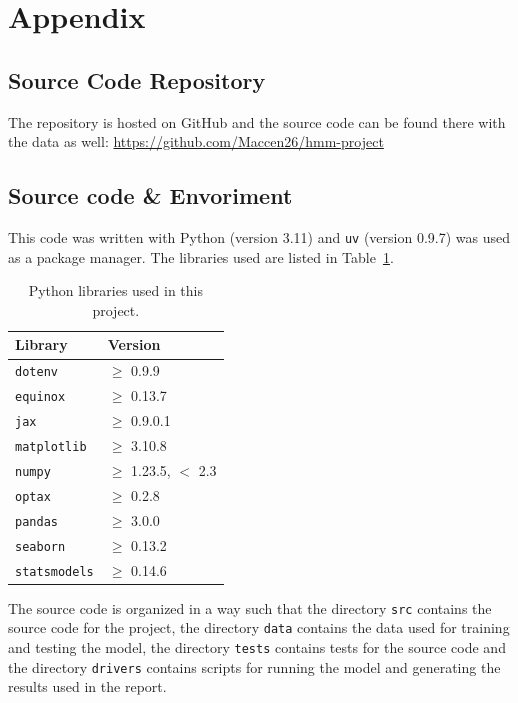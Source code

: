 \section{Appendix}

\subsection{Source Code Repository} \label{section:app:repo}
The repository is hosted on GitHub and the source code can be found there with the data as well:
\url{https://github.com/Maccen26/hmm-project}

\subsection{Source code \& Envoriment} \label{section:app:env}
This code was written with Python (version 3.11) and \texttt{uv} (version 0.9.7) \cite{astral_uv_docs} was used as a package manager.
The libraries used are listed in Table~\ref{tab:libraries}.

\begin{table}[H]
    \centering
    \begin{tabular}{ll}
        \toprule
        \textbf{Library} & \textbf{Version} \\
        \midrule
        \texttt{dotenv}      & $\geq$ 0.9.9 \\
        \texttt{equinox}     & $\geq$ 0.13.7 \\
        \texttt{jax}         & $\geq$ 0.9.0.1 \\
        \texttt{matplotlib}  & $\geq$ 3.10.8 \\
        \texttt{numpy}       & $\geq$ 1.23.5, $<$ 2.3 \\
        \texttt{optax}       & $\geq$ 0.2.8 \\
        \texttt{pandas}      & $\geq$ 3.0.0 \\
        \texttt{seaborn}     & $\geq$ 0.13.2 \\
        \texttt{statsmodels} & $\geq$ 0.14.6 \\
        \bottomrule
    \end{tabular}
    \caption{Python libraries used in this project.}
    \label{tab:libraries}
\end{table}

The source code is organized in a way such that the directory \texttt{src} contains the source code for the project,
the directory \texttt{data} contains the data used for training and testing the model,
the directory \texttt{tests} contains tests for the source code and
the directory \texttt{drivers} contains scripts for running the model and generating the results used in the report.

